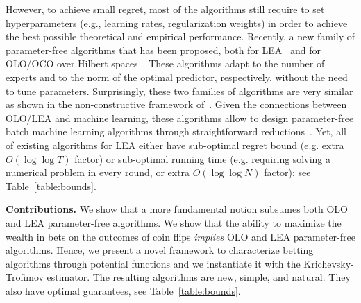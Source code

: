 However, to achieve small regret, most of the algorithms still require to set
hyperparameters (e.g., learning rates, regularization weights) in order to
achieve the best possible theoretical and empirical performance.  Recently, a
new family of parameter-free algorithms that has been proposed, both for
\ac{LEA}~\cite{Chaudhuri-Freund-Hsu-2009, Chernov-Vovk-2010, Luo-Schapire-2014,
Luo-Schapire-2015, Koolen-van-Erven-2015} and for \ac{OLO}/\ac{OCO} over
Hilbert spaces~\cite{Streeter-McMahan-2012, Orabona-2013,
McMahan-Abernethy-2013, McMahan-Orabona-2014, Orabona-2014}.  These algorithms
adapt to the number of experts and to the norm of the optimal predictor,
respectively, without the need to tune parameters.  Surprisingly, these two
families of algorithms are very similar as shown in the non-constructive
framework of~\cite{Foster-Rakhlin-Sridharan-2015}.  Given the connections
between \ac{OLO}/\ac{LEA} and machine learning, these algorithms allow to
design parameter-free batch machine learning algorithms through straightforward
reductions~\cite{Orabona-2014, Luo-Schapire-2015}.  Yet, all of existing
algorithms for LEA either have sub-optimal regret bound (e.g. extra $O(\log
\log T)$ factor) or sub-optimal running time (e.g. requiring solving a
numerical problem in every round, or extra $O(\log \log N)$ factor); see
Table~\ref{table:bounds}.

\textbf{Contributions.} We show that a more fundamental notion subsumes both
\ac{OLO} and \ac{LEA} parameter-free algorithms. We show that the ability to
maximize the wealth in bets on the outcomes of coin flips \emph{implies}
\ac{OLO} and \ac{LEA} parameter-free algorithms.  Hence, we present a novel
framework to characterize betting algorithms through potential functions and we
instantiate it with the Krichevsky-Trofimov estimator.  The resulting
algorithms are new, simple, and natural. They also have optimal guarantees, see
Table~\ref{table:bounds}.

